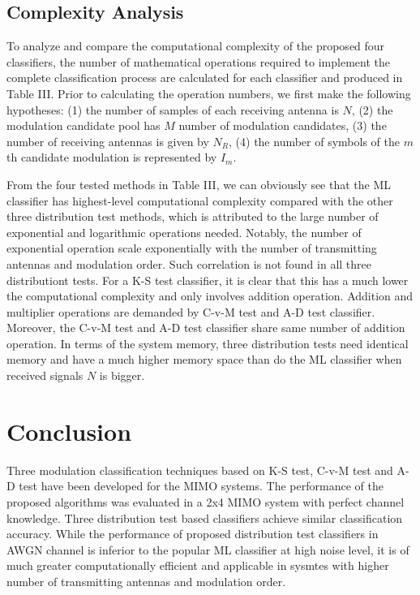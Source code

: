 \documentclass[conference]{IEEEtran}
\begin{document}
\subsection{ Complexity Analysis}
To analyze and compare the computational complexity of the proposed four classifiers, the number of mathematical operations required to implement the complete classification process are calculated for each classifier and produced in Table III. Prior to calculating the operation numbers, we first make the following hypotheses: (1) the number of samples of each receiving antenna is $N$, (2) the modulation candidate pool has $M$ number of modulation candidates, (3) the number of receiving antennas is given by $N_{R}$, (4) the number of symbols of the $m$th candidate modulation is represented by $I_m$.
\par From the four tested methods in Table III, we can obviously see that the ML classifier has highest-level computational complexity compared with the other three distribution test methods, which is attributed to the large number of exponential and logarithmic operations needed. Notably, the number of exponential operation scale exponentially with the number of transmitting antennas and modulation order. Such correlation is not found in all three distributiont tests. For a K-S test classifier, it is clear that this has a much lower the computational complexity and only involves addition operation. Addition and multiplier operations are demanded by C-v-M test and A-D test classifier. Moreover, the C-v-M test and A-D test classifier share same number of addition operation. In terms of the system memory, three distribution tests need identical memory and have a much higher memory space than do the ML classifier when received signals $N$ is bigger.

\section{Conclusion}
Three modulation classification techniques based on K-S test, C-v-M test and A-D test have been developed for the MIMO systems. The performance of the proposed algorithms was evaluated in a 2x4 MIMO system with perfect channel knowledge. Three distribution test based classifiers achieve similar classification accuracy. While the performance of proposed distribution test classifiers in AWGN channel is inferior to the popular ML classifier at high noise level, it is of much greater computationally efficient and applicable in sysmtes with higher number of transmitting antennas and modulation order.
\end{document}
